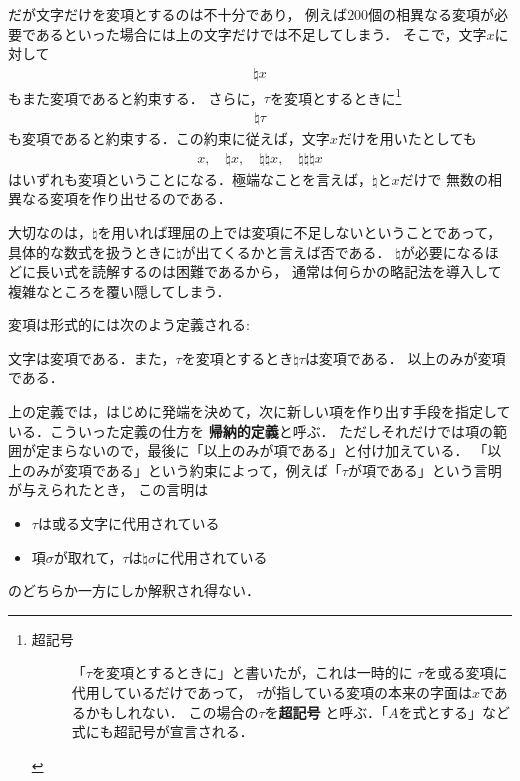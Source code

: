 	だが文字だけを変項とするのは不十分であり，
	例えば$200$個の相異なる変項が必要であるといった場合には上の文字だけでは不足してしまう．
	そこで，文字$x$に対して
	\begin{align}
		\natural x
	\end{align}
	もまた変項であると約束する．
	さらに，$\tau$を変項とするときに\footnote{
		\begin{description}
			\item[超記号]
				「$\tau$を変項とするときに」と書いたが，これは一時的に
				$\tau$を或る変項に代用しているだけであって，
				$\tau$が指している変項の本来の字面は$x$であるかもしれない．
				この場合の$\tau$を{\bf 超記号}
				と呼ぶ．「$A$を式とする」など式にも超記号が宣言される．
		\end{description}
	}
	\begin{align}
		\natural \tau
	\end{align}
	も変項であると約束する．この約束に従えば，文字$x$だけを用いたとしても
	\begin{align}
		x,\quad \natural x, \quad \natural \natural x, \quad \natural \natural \natural x
	\end{align}
	はいずれも変項ということになる．極端なことを言えば，$\natural$と$x$だけで
	無数の相異なる変項を作り出せるのである．
	
	大切なのは，$\natural$を用いれば理屈の上では変項に不足しないということであって，
	具体的な数式を扱うときに$\natural$が出てくるかと言えば否である．
	$\natural$が必要になるほどに長い式を読解するのは困難であるから，
	通常は何らかの略記法を導入して複雑なところを覆い隠してしまう．
	
	変項は形式的には次のよう定義される:
	
	\begin{screen}
		\begin{metadfn}[変項]
			文字は変項である．また，$\tau$を変項とするとき$\natural \tau$は変項である．
			以上のみが変項である．
		\end{metadfn}
	\end{screen}
	
	上の定義では，はじめに発端を決めて，次に新しい項を作り出す手段を指定している．こういった定義の仕方を
	{\bf 帰納的定義}と呼ぶ．
	ただしそれだけでは項の範囲が定まらないので，最後に「以上のみが項である」と付け加えている．
	「以上のみが変項である」という約束によって，例えば「$\tau$が項である」という言明が与えられたとき，
	この言明は
	\begin{itemize}
		\item $\tau$は或る文字に代用されている
		\item 項$\sigma$が取れて\footnotemark，$\tau$は$\natural \sigma$に代用されている
	\end{itemize}
	のどちらか一方にしか解釈され得ない．
	
